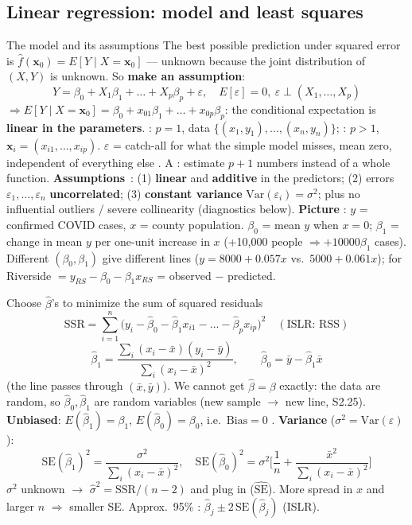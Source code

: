 \subsection{Linear regression: model and least squares}
\begin{topic}{The model and its assumptions}
 The best possible prediction under squared error is $\hat f(\mathbf x_0)=E[Y\mid X=\mathbf x_0]$ --- unknown because the joint distribution of $(X,Y)$ is unknown. So \textbf{make an assumption}:
\[ Y=\beta_0+X_1\beta_1+\dots+X_p\beta_p+\varepsilon,\quad E[\varepsilon]=0,\ \varepsilon \perp (X_1,\dots,X_p) \]
$\Rightarrow E[Y\mid X=\mathbf x_0]=\beta_0+x_{01}\beta_1+\dots+x_{0p}\beta_p$: the conditional expectation is \textbf{linear in the parameters}. : $p=1$, data $\{(x_1,y_1),\dots,(x_n,y_n)\}$; : $p>1$, $\mathbf x_i=(x_{i1},\dots,x_{ip})$. $\varepsilon$ = catch-all for what the simple model misses, mean zero, independent of everything else . A : estimate $p+1$ numbers instead of a whole function.
\textbf{Assumptions} \,: (1) \textbf{linear} and \textbf{additive} in the predictors; (2) errors $\varepsilon_1,\dots,\varepsilon_n$ \textbf{uncorrelated}; (3) \textbf{constant variance} $\mathrm{Var}(\varepsilon_i)=\sigma^2$; plus no influential outliers / severe collinearity (diagnostics below).
\textbf{Picture} : $y$ = confirmed COVID cases, $x$ = county population.  $\beta_0$ = mean $y$ when $x=0$;  $\beta_1$ = change in mean $y$ per one-unit increase in $x$ (+10{,}000 people $\Rightarrow +10000\beta_1$ cases). Different $(\beta_0,\beta_1)$ give different lines ($y=8000+0.057x$ vs.\ $5000+0.061x$);  for Riverside $=y_{RS}-\beta_0-\beta_1x_{RS}$ = observed $-$ predicted.
\end{topic}

\begin{keybox}
Choose $\hat\beta$'s to minimize the sum of squared residuals
\[ \mathrm{SSR}=\sum_{i=1}^n\big(y_i-\hat\beta_0-\hat\beta_1x_{i1}-\dots-\hat\beta_px_{ip}\big)^2\quad(\text{ISLR: RSS}) \]
\[ \hat\beta_1=\frac{\sum_i(x_i-\bar x)(y_i-\bar y)}{\sum_i(x_i-\bar x)^2},\qquad \hat\beta_0=\bar y-\hat\beta_1\bar x \]
(the line passes through $(\bar x,\bar y)$). We cannot get $\hat\beta=\beta$ exactly: the data are random, so $\hat\beta_0,\hat\beta_1$ are random variables (new sample $\to$ new line, S2.25).
\textbf{Unbiased}: $E(\hat\beta_1)=\beta_1$, $E(\hat\beta_0)=\beta_0$, i.e.\ $\mathrm{Bias}=0$ .
\textbf{Variance} ($\sigma^2=\mathrm{Var}(\varepsilon)$):
\[ \mathrm{SE}(\hat\beta_1)^2=\frac{\sigma^2}{\sum_i(x_i-\bar x)^2},\quad \mathrm{SE}(\hat\beta_0)^2=\sigma^2\Big[\frac1n+\frac{\bar x^2}{\sum_i(x_i-\bar x)^2}\Big] \]
$\sigma^2$ unknown $\to$ $\hat\sigma^2=\mathrm{SSR}/(n-2)$ and plug in ($\widehat{\mathrm{SE}}$). More spread in $x$ and larger $n$ $\Rightarrow$ smaller SE. Approx.\ 95\% : $\hat\beta_j\pm2\,\mathrm{SE}(\hat\beta_j)$ (ISLR).
\end{keybox}

